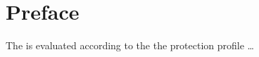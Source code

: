 \clearpage{}

\hypertarget{sec:preface}{\chapter*{Preface}
\label{sec:preface}}

The \emph{\thisproductlong{}} is evaluated according to the the protection profile \citetitle{\thispp} \citepp{}\dots


